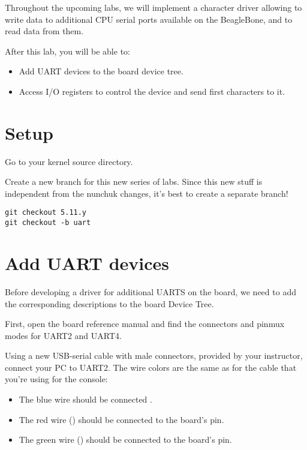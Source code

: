 
Throughout the upcoming labs, we will implement a character driver
allowing to write data to additional CPU serial ports available on
the BeagleBone, and to read data from them.

After this lab, you will be able to:

\begin{itemize}
\item Add UART devices to the board device tree.
\item Access I/O registers to control the device and
      send first characters to it.
\end{itemize}

\section{Setup}

Go to your kernel source directory.

Create a new branch for this new series of labs. Since this new stuff
is independent from the nunchuk changes, it's best to create a separate
branch!

\begin{verbatim}
git checkout 5.11.y
git checkout -b uart
\end{verbatim}

\section{Add UART devices}

Before developing a driver for additional UARTS on the board, we
need to add the corresponding descriptions to the board Device Tree.

First, open the board reference manual and find the connectors
and pinmux modes for UART2 and UART4.

Using a new USB-serial cable with male connectors, provided by your
instructor, connect your PC to UART2. The wire colors are the same
as for the cable that you're using for the console:

\begin{itemize}
\item The blue wire should be connected .
\item The red wire () should be connected to the board's  pin.
\item The green wire () should be connected to the board's  pin.
\end{itemize}

